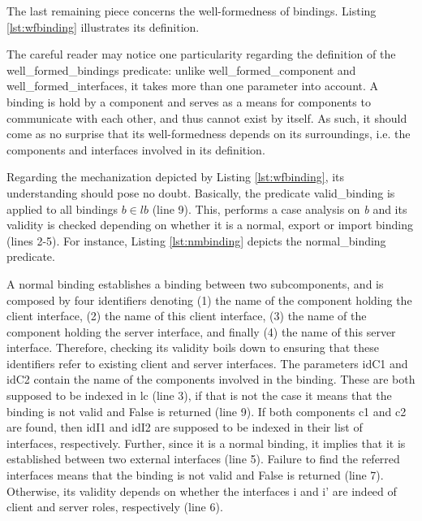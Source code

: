     

	The last remaining piece concerns the well-formedness of \textsf{binding}s. 
	Listing \ref{lst:wfbinding} illustrates its definition.

			
	
	\noindent The careful reader may notice one particularity regarding the definition of the
	\textsf{well\_formed\_bindings} predicate: unlike  \textsf{well\_formed\_component} and
	\textsf{well\_formed\_interfaces}, it takes more than one parameter into account.
	A binding is hold by a component and serves as a means for 
	components to communicate with each other, and thus cannot 
	exist by itself. As such, it should come as no surprise that its
	well-formedness depends on its surroundings, i.e. the
	components and interfaces involved in its definition.
			
	Regarding the	mechanization depicted by Listing \ref{lst:wfbinding}, its 
	understanding should pose no doubt.  Basically, the predicate \textsf{valid\_binding}
	is applied to all bindings $b \in lb$ (line 9). This, performs a case analysis
	on \textit{b} and its validity is checked depending on whether it is a 
	\textsf{normal}, \textsf{export} or \textsf{import binding} (lines 2-5).
	 For instance, Listing \ref{lst:nmbinding} depicts the \textsf{normal\_binding} predicate.
		
	
	
	\noindent  A \textsf{normal binding} establishes a binding between two sub\textsf{component}s, and	
	is composed by four identifiers denoting
	(1) the name of the \textsf{component} holding the \textsf{client interface}, (2) the name
	of this \textsf{client interface}, (3) the name of the \textsf{component} holding the \textsf{server interface}, and
	finally (4) the name of this \textsf{server interface}. Therefore, checking its validity boils down
	to ensuring that these identifiers refer to existing client and server interfaces.
	The parameters \textsf{idC1} and \textsf{idC2} contain the name of the \textsf{component}s
	involved in the \textsf{binding}. These are both supposed to be indexed in \textsf{lc} (line 3),
	if that is not the case it means that the binding is not valid and \textsf{False} is 
	returned (line 9). If both components \textsf{c1} and \textsf{c2} are found, then 
	\textsf{idI1} and \textsf{idI2} are supposed to be indexed in their list of \textsf{interface}s, respectively.
	Further, since it is a \textsf{normal binding}, it implies that it is established between 
	two \textsf{external} interfaces (line 5). Failure to find the referred \textsf{interface}s means that
	the binding is not valid and \textsf{False} is returned (line 7). Otherwise,
	its validity depends on whether 
	the \textsf{interface}s \textsf{i} and \textsf{i'} are indeed of \textsf{client} and \textsf{server} roles, respectively (line 6).
			
